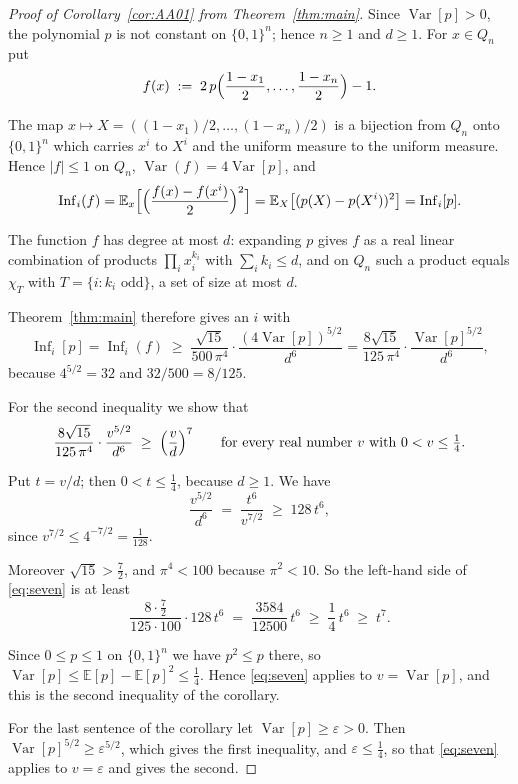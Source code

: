 \documentclass[11pt,reqno]{amsart}
\theoremstyle{definition}
\theoremstyle{remark}
\numberwithin{equation}{section}
\theoremstyle{named}
\theoremstyle{plain}
\newcommand{\E}{\mathbb{E}}
\newcommand{\Var}{\operatorname{Var}}
\newcommand{\Inf}{\operatorname{Inf}}
\newcommand{\eps}{\varepsilon}
\newcommand{\abs}[1]{\lvert #1\rvert}
\begin{document}
\begin{proof}[Proof of Corollary~\ref{cor:AA01} from Theorem~\ref{thm:main}]
Since $\Var[p]>0$, the polynomial $p$ is not constant on $\{0,1\}^{n}$; hence $n\ge1$ and $d\ge1$.
For $x\in Q_n$ put
\[
   f(x)\;:=\;2\,p\Bigl(\frac{1-x_1}{2},\dots,\frac{1-x_n}{2}\Bigr)-1 .
\]

The map $x\mapsto X=((1-x_1)/2,\dots,(1-x_n)/2)$ is a bijection from $Q_n$ onto $\{0,1\}^{n}$ which
carries $x^{i}$ to $X^{i}$ and the uniform measure to the uniform measure. Hence $\abs{f}\le 1$ on $Q_n$,
$\Var(f)=4\Var[p]$, and
\[
   \Inf_i(f)=\E_x\Bigl[\Bigl(\frac{f(x)-f(x^{i})}{2}\Bigr)^{2}\Bigr]
           =\E_X\bigl[(p(X)-p(X^{i}))^{2}\bigr]=\Inf_i[p].
\]

The function $f$ has degree at most $d$: expanding $p$ gives $f$ as a real linear combination of
products $\prod_i x_i^{k_i}$ with $\sum_ik_i\le d$, and on $Q_n$ such a product equals $\chi_T$ with
$T=\{i: k_i \text{ odd}\}$, a set of size at most $d$.

Theorem~\ref{thm:main} therefore gives an $i$ with
\[
   \Inf_i[p]=\Inf_i(f)\;\ge\;\frac{\sqrt{15}}{500\,\pi^{4}}\cdot\frac{(4\Var[p])^{5/2}}{d^{6}}
   =\frac{8\sqrt{15}}{125\,\pi^{4}}\cdot\frac{\Var[p]^{5/2}}{d^{6}},
\]
because $4^{5/2}=32$ and $32/500=8/125$.

For the second inequality we show that
\begin{equation}\label{eq:seven}
   \frac{8\sqrt{15}}{125\,\pi^{4}}\cdot\frac{v^{5/2}}{d^{6}}\;\ge\;\Bigl(\frac{v}{d}\Bigr)^{7}
   \qquad\text{for every real number $v$ with }0<v\le\tfrac14 .
\end{equation}

Put $t=v/d$; then $0<t\le\frac14$, because $d\ge1$. We have
\[
   \frac{v^{5/2}}{d^{6}}\;=\;\frac{t^{6}}{v^{7/2}}\;\ge\;128\,t^{6},
\]
since $v^{7/2}\le4^{-7/2}=\frac1{128}$.

Moreover
$\sqrt{15}>\frac72$, and $\pi^{4}<100$ because $\pi^{2}<10$. So the left-hand side of
\eqref{eq:seven} is at least
\[
   \frac{8\cdot\frac72}{125\cdot100}\cdot128\,t^{6}\;=\;\frac{3584}{12500}\,t^{6}
   \;\ge\;\frac14\,t^{6}\;\ge\;t^{7}.
\]

Since $0\le p\le 1$ on $\{0,1\}^{n}$ we have $p^{2}\le p$ there, so
$\Var[p]\le\E[p]-\E[p]^{2}\le\frac14$. Hence \eqref{eq:seven} applies to $v=\Var[p]$, and this is
the second inequality of the corollary.

For the last sentence of the corollary let $\Var[p]\ge\eps>0$. Then
$\Var[p]^{5/2}\ge\eps^{5/2}$, which gives the first inequality, and $\eps\le\frac14$, so that
\eqref{eq:seven} applies to $v=\eps$ and gives the second.
\end{proof}
\end{document}
